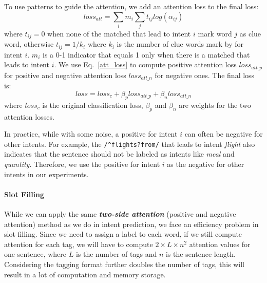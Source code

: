 To use \RE patterns to guide the attention, we add an attention loss to the final loss:
\begin{equation}
loss_{att} = \sum_{i}{m_i\sum_{j}{t_{ij}log(\alpha_{ij})}}
\label{att_loss}
\end{equation}
where $t_{ij} = 0$ when none of the matched \REs that lead to intent $i$ mark word $j$ as clue word, otherwise $t_{ij} = 1/k_{i}$ where $k_i$ is the number of clue words mark by \RE for intent $i$. $m_i$ is a 0-1 indicator that equals 1 only when there is a matched \RE that leads to intent $i$. We use Eq.~\ref{att_loss} to compute positive attention loss $loss_{att\_p}$ for positive \REs and negative attention loss $loss_{att\_n}$ for negative ones. The final loss is:
\begin{equation}
loss = loss_{c} + \beta_p loss_{att\_p} + \beta_n loss_{att\_n}
\end{equation}
where $loss_{c}$ is the original classification loss, $\beta_p$ and $\beta_n$ are weights for the two attention losses.

In practice, while with some noise, a positive \RE for intent $i$ can often be negative \REs for other intents. For example, the \RE \texttt{/\textasciicircum flights?\:from/} that leads to intent \emph{flight} also indicates that the sentence should not be labeled as intents like \emph{meal} and \emph{quantity}.
Therefore, we use the positive \REs for intent $i$ as the negative \REs for other intents in our experiments.

\paragraph{Slot Filling}
While we can apply the same \textbf{\emph{two-side attention}} (positive and negative attention) method as we do in intent prediction, we
face an efficiency problem in slot filling. Since we need to assign a label to each word, if we still compute attention for each tag, we
will have to compute $2\times L \times n^2$ attention values for one sentence, where $L$ is the number of tags and $n$ is the sentence
length. Considering the \BIO tagging format further doubles the number of tags, this will result in a lot of computation and memory
storage.

